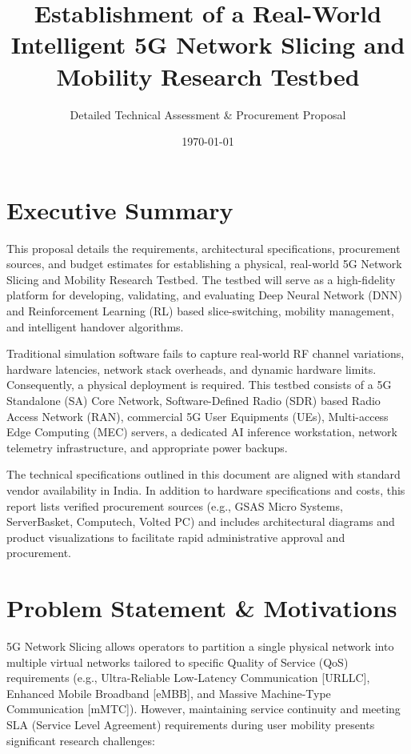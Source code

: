 \documentclass[12pt,a4paper]{article}\usepackage[a4paper,margin=1in]{geometry}\usepackage{graphicx}\usepackage{longtable}\usepackage{booktabs}\usepackage{hyperref}\usepackage{enumitem}\usepackage{amsmath}\usepackage{tikz}\usepackage{pgfgantt}\usepackage{setspace}\setstretch{1.15}\usetikzlibrary{positioning,arrows.meta,shapes.geometric}
\title{Establishment of a Real-World Intelligent 5G Network Slicing and Mobility Research Testbed}\author{Detailed Technical Assessment \& Procurement Proposal}
\date{\today}
\begin{document}
	\maketitle
	\tableofcontents
	\newpage
	
	\section{Executive Summary}
	This proposal details the requirements, architectural specifications, procurement sources, and budget estimates for establishing a physical, real-world 5G Network Slicing and Mobility Research Testbed. The testbed will serve as a high-fidelity platform for developing, validating, and evaluating Deep Neural Network (DNN) and Reinforcement Learning (RL) based slice-switching, mobility management, and intelligent handover algorithms.
	
	Traditional simulation software fails to capture real-world RF channel variations, hardware latencies, network stack overheads, and dynamic hardware limits. Consequently, a physical deployment is required. This testbed consists of a 5G Standalone (SA) Core Network, Software-Defined Radio (SDR) based Radio Access Network (RAN), commercial 5G User Equipments (UEs), Multi-access Edge Computing (MEC) servers, a dedicated AI inference workstation, network telemetry infrastructure, and appropriate power backups.
	
	The technical specifications outlined in this document are aligned with standard vendor availability in India. In addition to hardware specifications and costs, this report lists verified procurement sources (e.g., GSAS Micro Systems, ServerBasket, Computech, Volted PC) and includes architectural diagrams and product visualizations to facilitate rapid administrative approval and procurement.
	
	\section{Problem Statement \& Motivations}
	5G Network Slicing allows operators to partition a single physical network into multiple virtual networks tailored to specific Quality of Service (QoS) requirements (e.g., Ultra-Reliable Low-Latency Communication [URLLC], Enhanced Mobile Broadband [eMBB], and Massive Machine-Type Communication [mMTC]). However, maintaining service continuity and meeting SLA (Service Level Agreement) requirements during user mobility presents significant research challenges:
	
\end{document}
